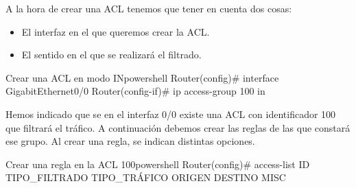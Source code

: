 A la hora de crear una ACL tenemos que tener en cuenta dos cosas:

\begin{itemize}
    \item El interfaz en el que queremos crear la ACL.
    \item El sentido en el que se realizará el filtrado.
\end{itemize}

\begin{mycode}{Crear una ACL en modo IN}{powershell}{}
Router(config)# interface GigabitEthernet0/0
Router(config-if)# ip access-group 100 in
\end{mycode}

Hemos indicado que se en el interfaz 0/0 existe una ACL con identificador 100 que filtrará el tráfico. A continuación debemos crear las reglas de las que constará ese grupo. Al crear una regla, se indican distintas opciones.

\begin{mycode}{Crear una regla en la ACL 100}{powershell}{{\footnotesize }}
Router(config)# access-list ID TIPO_FILTRADO TIPO_TRÁFICO ORIGEN  DESTINO  MISC
\end{mycode}

